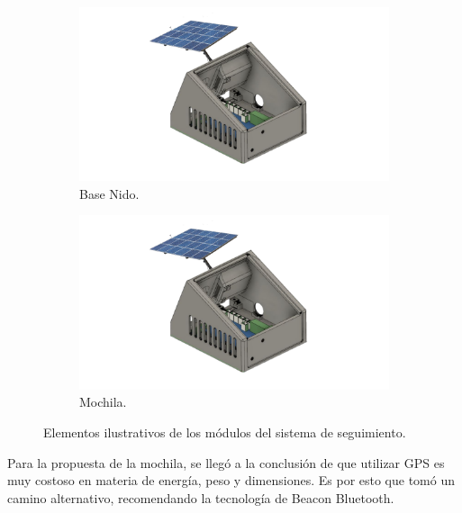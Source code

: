 \begin{figure}[H]
\begin{subfigure}{0.5\textwidth}
    \end{subfigure}	\\
    \begin{subfigure}{0.5\textwidth}
    	\centering
    	\includegraphics[width=\linewidth, page=3]{ImagenesFactibilidad/beacon}
    	\caption{Base Nido.}
    	\label{fact:nido}
    \end{subfigure}\hfill
    \begin{subfigure}{0.5\textwidth}
    	\centering
    	\includegraphics[width=\linewidth,page=4]{ImagenesFactibilidad/beacon}
    	\caption{Mochila.}
	\label{fact:beacon}
    \end{subfigure}
	\caption{Elementos ilustrativos de los módulos del sistema de seguimiento.}
	\label{fig:componentes_beacon_ilustrativo}
\end{figure}

Para la propuesta de la mochila, se llegó a la conclusión de que utilizar GPS es muy costoso en materia de energía, peso y dimensiones. Es por esto que tomó un camino alternativo, recomendando la tecnología de Beacon Bluetooth.

